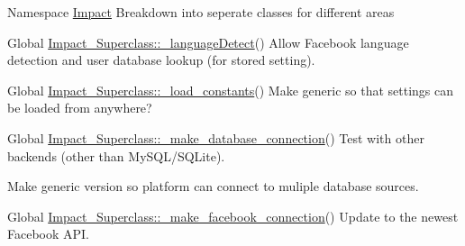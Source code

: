 \label{todo__todo000002}
\hypertarget{todo__todo000002}{}
 
\begin{DoxyDescription}
\item[Namespace \hyperlink{namespaceImpact}{Impact} ]Breakdown into seperate classes for different areas


\end{DoxyDescription}

\label{todo__todo000007}
\hypertarget{todo__todo000007}{}
 
\begin{DoxyDescription}
\item[Global \hyperlink{classImpact__Superclass_a06e0d9a42275d91e76f877af01c9b0de}{Impact\_\-Superclass::\_\-languageDetect}() ]Allow Facebook language detection and user database lookup (for stored setting). 
\end{DoxyDescription}

\label{todo__todo000003}
\hypertarget{todo__todo000003}{}
 
\begin{DoxyDescription}
\item[Global \hyperlink{classImpact__Superclass_a2c7019c3058ec100b498ed14dd2c4d23}{Impact\_\-Superclass::\_\-load\_\-constants}() ]Make generic so that settings can be loaded from anywhere? 
\end{DoxyDescription}

\label{todo__todo000001}
\hypertarget{todo__todo000001}{}
 
\begin{DoxyDescription}
\item[Global \hyperlink{classImpact__Superclass_a16870e7c667f514a099afacc1009252b}{Impact\_\-Superclass::\_\-make\_\-database\_\-connection}() ]Test with other backends (other than MySQL/SQLite). 

Make generic version so platform can connect to muliple database sources. 
\end{DoxyDescription}

\label{todo__todo000004}
\hypertarget{todo__todo000004}{}
 
\begin{DoxyDescription}
\item[Global \hyperlink{classImpact__Superclass_ab2e18c82d6909c852402b07aa48340bc}{Impact\_\-Superclass::\_\-make\_\-facebook\_\-connection}() ]Update to the newest Facebook API. 
\end{DoxyDescription}

\label{todo__todo000006}
\hypertarget{todo__todo000006}{}
 
